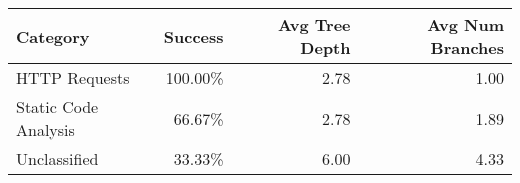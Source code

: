 \begin{tabular}{lrrr}
\toprule
Category & Success & Avg Tree Depth & Avg Num Branches \\
\midrule
HTTP Requests & 100.00\% & 2.78 & 1.00 \\
Static Code Analysis & 66.67\% & 2.78 & 1.89 \\
Unclassified & 33.33\% & 6.00 & 4.33 \\
\bottomrule
\end{tabular}
